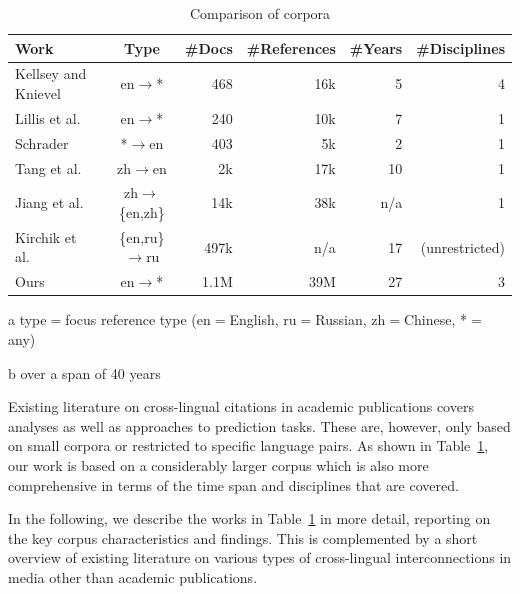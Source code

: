 \begin{table}
\caption{Comparison of corpora}
 \label{tab:relworkcomp}
  \centering
  \begin{small}
 \begin{threeparttable}
 \begin{tabular}{lcrrrr}
 \toprule
   Work & Type\tnote{a} & \#Docs & \hphantom{m}\#References & \hphantom{m}\#Years & \hphantom{nn}\#Disciplines \\
   \midrule
   Kellsey and Knievel~\cite{Kellsey2004} & en$\rightarrow$* & 468 & 16k & 5\tnote{b} & 4 \\
   Lillis et al.~\cite{Lillis2010} & en$\rightarrow$* & 240 & 10k & 7 & 1 \\
   Schrader~\cite{Schrader2019} & *$\rightarrow$en & 403 & 5k & 2 & 1 \\
   Tang et al.~\cite{Tang2014} & zh$\rightarrow$en & 2k & 17k & 10 & 1 \\
   Jiang et al.~\cite{Jiang2018,Jiang2018b} & zh$\rightarrow$\{en,zh\} & 14k & 38k & n/a & 1 \\
   Kirchik et al.~\cite{Kirchik2012} & \{en,ru\}$\rightarrow$ru & 497k & n/a & 17 & (unrestricted) \\
   Ours & en$\rightarrow$* &  1.1M & 39M & 27 & 3 \\
   \bottomrule
 \end{tabular}
 \begin{tablenotes}
    \item[a] type$=$focus reference type (en$=$English, ru$=$Russian, zh$=$Chinese, *$=$any)
    \item[b] over a span of 40 years
 \end{tablenotes}
\end{threeparttable}
  \end{small}
\end{table}

Existing literature on cross-lingual citations in academic publications covers analyses as well as approaches to prediction tasks. These are, however, only based on small corpora or restricted to specific language pairs. As shown in Table~\ref{tab:relworkcomp}, our work is based on a considerably larger corpus which is also more comprehensive in terms of the time span and disciplines that are covered.

In the following, we describe the works in Table~\ref{tab:relworkcomp} in more detail, reporting on the key corpus characteristics and findings. This is complemented by a short overview of existing literature on various types of cross-lingual interconnections in media other than academic publications.


